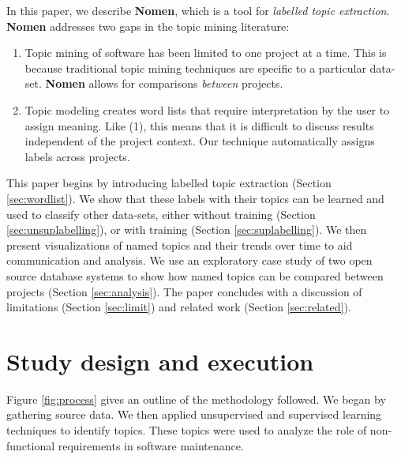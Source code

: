 \documentclass[]{sig-alternate}
\begin{document}
In this paper, we describe \textbf{Nomen}, which is a tool for \emph{labelled topic extraction}. \textbf{Nomen} addresses two gaps in the topic mining literature:
\begin{enumerate}
  \item Topic mining of software has been limited to one project at a time. This is because traditional topic mining techniques are specific to a particular data-set. \textbf{Nomen} allows for comparisons \textit{between} projects. 
  \item Topic modeling creates word lists that require interpretation by the user to assign meaning. Like (1), this means
that it is difficult to discuss results independent of the project context. Our technique automatically assigns labels across projects.
\end{enumerate}

This paper begins by introducing labelled topic extraction (Section \ref{sec:wordlist}). We show that these labels with their topics can be learned and used to classify other data-sets, either without training (Section \ref{sec:unsuplabelling}), or with training (Section \ref{sec:suplabelling}). We then present visualizations of named topics and their trends over time to aid communication and analysis. We use an exploratory case study of two open source database systems to show how named topics can be compared between projects  (Section \ref{sec:analysis}). The paper concludes with a discussion of limitations (Section \ref{sec:limit}) and related work (Section \ref{sec:related}).



\section{Study design and execution}
Figure \ref{fig:process} gives an outline of the methodology followed. We began by gathering source data. We then applied unsupervised and supervised learning techniques to identify topics. These topics were used to analyze the role of non-functional requirements in software maintenance.
\end{document}
